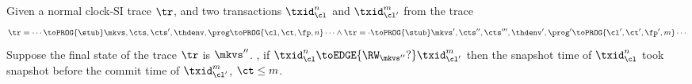 \begin{lemma}[\( \RW_\mkvs \)]
    \label{lem:clock-si-rw}
    Given a normal clock-SI trace \( \tr \), and two transactions \( \txid_\cl^n \) and \( \txid_{\cl'}^m \) from the trace
    \[
        \begin{array}{@{}l@{}}
            \tr = \cdots \toPROG{\stub} \mkvs,\cts,\cts',\thdenv, \prog \toPROG{\cl,\ct,\fp,n} \cdots \land 
            \tr = \cdot \toPROG{\stub} \mkvs',\cts'',\cts''',\thdenv', \prog' \toPROG{\cl',\ct',\fp',m} \cdots
        \end{array}
    \]
    Suppose the final state of the trace \( \tr \) is \( \mkvs'' \).
    , if \( \txid_\cl^n \toEDGE{\RW_{\mkvs''}?} \txid_{\cl'}^m \) then the snapshot time of \( \txid_{\cl}^n \) took snapshot before the commit time of \( \txid_{\cl'}^m \), \ie \( \ct \leq m \).
\end{lemma}
